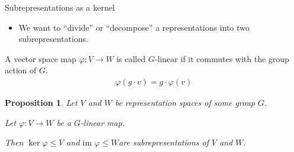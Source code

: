 \documentclass[10pt]{beamer}
\newtheorem{proposition}{Proposition}[theorem]
\begin{document}
	\begin{frame}{Subrepresentations as a kernel}
		
		\begin{itemize}
			\item We want to ``divide'' or ``decompose'' a representations into two subrepresentations.
		\end{itemize}\pause
		
		\begin{definition}
			A vector space map $\varphi : V \rightarrow W$ is called $G$-linear if it commutes with the group action of $G$.
							\begin{align*}
									\varphi(g \cdot v) = g \cdot \varphi(v)
								\end{align*}
		\end{definition}\pause
		
		\begin{proposition}
			Let $V$ and $W$ be representation spaces of some group $G$.
			
			Let $\varphi: V \rightarrow W$ be a $G$-linear map. 
			
			Then $\ker \varphi \leq V$ and $\text{im } \varphi \leq W$\pause are subrepresentations of $V$ and $W$.
		\end{proposition}
	\end{frame}
\end{document}
